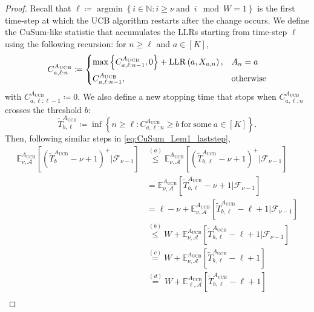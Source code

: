 \documentclass[10pt,a4paper]{amsart}
\newcommand{\E}{\mathbb{E}}
\newcommand{\argmin}{\mathop{\mathrm{argmin}}}
\newcommand{\lb}{\left[}
\newcommand{\lbp}{\left\{}
\newcommand{\rbp}{\right\}}
\newcommand{\lp}{\left(}
\newcommand{\mbb}{\mathbb}
\newcommand{\mcal}{\mathcal}
\newcommand{\mrm}{\mathrm}
\newcommand{\rb}{\right]}
\newcommand{\rp}{\right)}
\begin{document}
\begin{proof}
Recall that $\ell \coloneqq \argmin \lbp i \in \mbb{N} : i \geq \nu \mrm{\:and}\enspace i \mod W = 1 \rbp$ is the first time-step at which the UCB algorithm restarts after the change occurs. We define the CuSum-like statistic that accumulates the LLRs starting from time-step $\ell$ using the following recursion: for $n \geq \ell$ and $a \in \lb K \rb$, 
%
\begin{equation}\label{eq:windowed_CuSum_sep}
    C_{a,\ell:n}^{A_{\mrm{UCB}}} \coloneqq \begin{dcases}
        \max \lbp C_{a,\ell:n - 1}^{A_{\mrm{UCB}}}, 0 \rbp + \mrm{LLR} \lp a, X_{a,n} \rp,& A_{n} = a\\
        C_{a,\ell:n - 1}^{A_{\mrm{UCB}}},& \mrm{otherwise}
    \end{dcases}
\end{equation}
%
with $C_{a, \ell: \ell - 1}^{A_{\mrm{UCB}}} \coloneqq 0$. We also define a new stopping time that stops when $C_{a,\ell:n}^{A_{\mrm{UCB}}}$ crosses the threshold $b$: 
%
\begin{equation}\label{eq:windowed_T_sep}
    \tilde{T}_{b, \ell}^{A_{\mrm{UCB}}} \coloneqq \inf \lbp n \geq \ell: C_{a, \ell:n}^{A_{\mrm{UCB}}} \geq b \mrm{\:for\:some\:} a \in \lb K \rb \rbp.
\end{equation}
%
Then, following similar steps in \eqref{eq:CuSum_Lem1_laststep},
%
\begin{align}
    \E_{\nu,\mcal{A}}^{A_{\mrm{UCB}}} \lb \lp \tilde{T}_{b}^{A_{\mrm{UCB}}} - \nu + 1\rp^{+} \Big| \mcal{F}_{\nu-1} \rb &\overset{(a)}{\leq} \E_{\nu,\mcal{A}}^{A_{\mrm{UCB}}} \lb \lp \tilde{T}_{b, \ell}^{A_{\mrm{UCB}}} - \nu + 1\rp^{+} \Big| \mcal{F}_{\nu-1} \rb \nonumber\\
    &= \E_{\nu,\mcal{A}}^{A_{\mrm{UCB}}} \lb \tilde{T}_{b, \ell}^{A_{\mrm{UCB}}} - \nu + 1 \Big| \mcal{F}_{\nu-1} \rb \nonumber\\
    &= \ell - \nu + \E_{\nu,\mcal{A}}^{A_{\mrm{UCB}}} \lb \tilde{T}_{b, \ell}^{A_{\mrm{UCB}}} - \ell + 1 \Big| \mcal{F}_{\nu-1} \rb \nonumber\\
    &\overset{(b)}{\leq} W + \E_{\nu,\mcal{A}}^{A_{\mrm{UCB}}} \lb \tilde{T}_{b, \ell}^{A_{\mrm{UCB}}} - \ell + 1 \Big| \mcal{F}_{\nu-1} \rb \nonumber\\
    &\overset{(c)}{=} W + \E_{\nu,\mcal{A}}^{A_{\mrm{UCB}}} \lb \tilde{T}_{b, \ell}^{A_{\mrm{UCB}}} - \ell + 1 \rb \nonumber\\
    &\overset{(d)}{=} W + \E_{\ell,\mcal{A}}^{A_{\mrm{UCB}}} \lb \tilde{T}_{b, \ell}^{A_{\mrm{UCB}}} - \ell + 1 \rb \nonumber\\

\end{align}
\end{proof}
\end{document}
